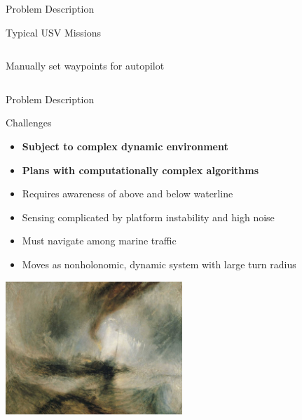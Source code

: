 \documentclass[9pt]{beamer}
\begin{document}
\begin{frame}{Problem Description}
\begin{block}{Typical USV Missions}
\begin{columns}
\begin{column}{0.5\textwidth}
\begin{block}{}
\begin{center}
                        \vline
                        \linebreak
                        Manually set waypoints for autopilot
                    \end{center}
                \end{block}
            \end{column}
        \end{columns}
    \end{block}
\end{frame}

\begin{frame}{Problem Description}
    \begin{block}{Challenges}
	    \begin{itemize}
    	    \item \textbf{Subject to complex dynamic environment}
    	    \item \textbf{Plans with computationally complex algorithms}
	        \item Requires awareness of above and below waterline
	        \item Sensing complicated by platform instability and high noise
    	    \item Must navigate among marine traffic
    	    \item Moves as nonholonomic, dynamic system with large turn radius
    	    \end{itemize}
    \end{block}
    \begin{center}
        \includegraphics[width=0.5\textwidth,trim={5cm 5cm 4cm 4cm},clip]{img/turner_boat.jpg}
    \end{center}
\end{frame}
\end{document}
